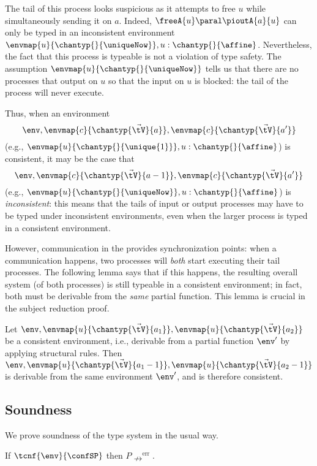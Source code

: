 \documentclass[copyright]{eptcs}
\begin{document}
The tail of this process looks suspicious as it attempts to free $u$ while
simultaneously sending it on $a$. Indeed, $\freeA{u} \paral \pioutA{a}{u}$ can
only be typed in an inconsistent environment
$\envmap{u}{\chantyp{}{\uniqueNow}}, u : \chantyp{}{\affine}$.  Nevertheless,
the fact that this process is typeable is not a violation of type safety. The
assumption $\envmap{u}{\chantyp{}{\uniqueNow}}$ tells us that there are no
processes that output on $u$ so that the input on $u$ is blocked: the tail of
the process will never execute.

Thus, when an environment $$\env, \envmap{c}{\chantyp{\vec{\tV}}{a}},
\envmap{c}{\chantyp{\vec{\tV}}{a'}}$$ (e.g., $\envmap{u}{\chantyp{}{\unique{1}}},
u : \chantyp{}{\affine}$) is consistent, it may be the case that $$\env,
\envmap{c}{\chantyp{\vec{\tV}}{a-1}}, \envmap{c}{\chantyp{\vec{\tV}}{a'}}$$ (e.g.,
$\envmap{u}{\chantyp{}{\uniqueNow}}, u : \chantyp{}{\affine}$) is \emph{inconsistent}:
this means that the tails of input or output processes may have to be typed
under inconsistent environments, even when the larger process is typed in a
consistent environment.

However, communication in the \pic provides synchronization points: when a
communication happens, two processes will \textit{both} start executing their
tail processes. The following lemma says that if this happens, the resulting
overall system (of both processes) is still typeable in a consistent
environment; in fact, both must be derivable from the \textit{same}
partial function. This lemma is crucial in the subject reduction proof.

\begin{lemma}
Let $\env, \envmap{u}{\chantyp{\vec{\tV}}{a_1}},
\envmap{u}{\chantyp{\vec{\tV}}{a_2}}$ be a consistent environment, i.e.,
derivable from a partial function $\env'$ by applying structural rules. Then
$\env, \envmap{u}{\chantyp{\vec{\tV}}{a_1-1}},
\envmap{u}{\chantyp{\vec{\tV}}{a_2-1}}$ is derivable from the same environment
$\env'$, and is therefore consistent. 
\end{lemma}

\subsection{Soundness}

We prove soundness of the type system in the usual way.

\begin{theorem}
If $\tcnf{\env}{\confSP}$ then $P \nrightarrow^\text{err}$.
\label{thm:safety}
\end{theorem}
\end{document}
